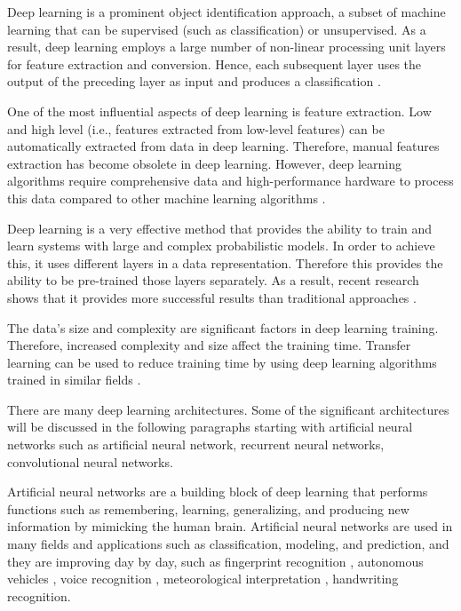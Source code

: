Deep learning is a prominent object identification approach, a subset of machine learning that can be supervised (such as classification) or unsupervised. As a result, deep learning employs a large number of non-linear processing unit layers for feature extraction and conversion. Hence, each subsequent layer uses the output of the preceding layer as input and produces a classification \cite{goodfellow2016deep}.

One of the most influential aspects of deep learning is feature extraction. Low and high level (i.e., features extracted from low-level features)
can be automatically extracted from data in deep learning. Therefore, manual features extraction has become obsolete in deep learning. However, deep learning algorithms require comprehensive data and high-performance hardware to process this data compared to other machine learning algorithms \cite{lecun2015deep}.

Deep learning is a very effective method that provides the ability to train and learn systems with large and complex probabilistic models. In order to achieve this, it uses different layers in a data representation. Therefore this provides the ability to be pre-trained those layers separately. As a result, recent research shows that it provides more successful results than traditional approaches \cite{chen2015net2net, huang2013cross}.

The data's size and complexity are significant factors in deep learning training. Therefore, increased complexity and size affect the training time. Transfer learning can be used to reduce training time by using deep learning algorithms trained in similar fields \cite{goodfellow2016deep}. 

There are many deep learning architectures. Some of the significant architectures will be discussed in the following paragraphs starting with artificial neural networks such as artificial neural network, recurrent neural networks, convolutional neural networks. 

Artificial neural networks are a building block of deep learning that performs functions such as remembering, learning, generalizing, and producing new information by mimicking the human brain. Artificial neural networks are used in many fields and applications such as classification, modeling, and prediction, and they are improving day by day, such as fingerprint recognition \cite{baldi1993neural}, autonomous vehicles \cite{tian2018deeptest}, voice recognition \cite{melin2006voice}, meteorological interpretation \cite{hsieh1998applying}, handwriting recognition\cite{oh2002class}.

